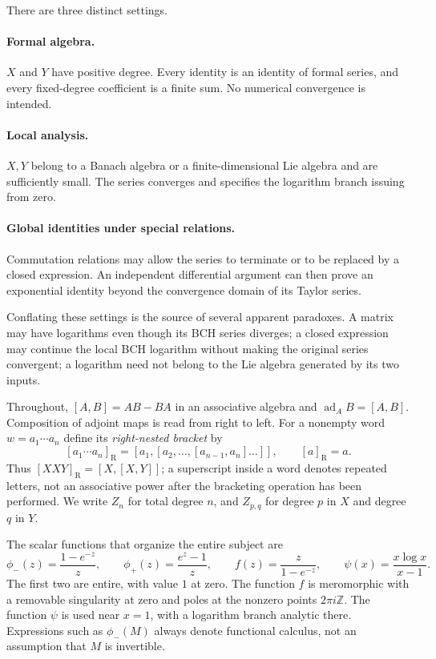 \documentclass[11pt]{article}
\numberwithin{equation}{section}
\theoremstyle{definition}
\theoremstyle{remark}
\DeclareMathOperator{\ad}{ad}
\newcommand{\Z}{\mathbb{Z}}
\newcommand{\RB}[1]{[#1]_{\mathrm R}}
\begin{document}
There are three distinct settings.

\paragraph{Formal algebra.}
$X$ and $Y$ have positive degree. Every identity is an identity of formal
series, and every fixed-degree coefficient is a finite sum. No numerical
convergence is intended.
\paragraph{Local analysis.}
$X,Y$ belong to a Banach algebra or a finite-dimensional Lie algebra and
are sufficiently small. The series converges and specifies the logarithm
branch issuing from zero.
\paragraph{Global identities under special relations.}
Commutation relations may allow the series to terminate or to be replaced
by a closed expression. An independent differential argument can then prove
an exponential identity beyond the convergence domain of its Taylor series.

Conflating these settings is the source of several apparent paradoxes.
A matrix may have logarithms even though its BCH series diverges; a closed
expression may continue the local BCH logarithm without making the original
series convergent; a logarithm need not belong to the Lie algebra generated
by its two inputs.

Throughout, $[A,B]=AB-BA$ in an associative algebra and
$\ad_A B=[A,B]$. Composition of adjoint maps is read from right to left.
For a nonempty word $w=a_1\cdots a_n$ define its \emph{right-nested bracket}
by
\begin{equation}\label{eq:rightbracket}
 \RB{a_1\cdots a_n}=[a_1,[a_2,\ldots,[a_{n-1},a_n]\ldots]],
 \qquad \RB{a}=a.
\end{equation}
Thus $\RB{XXY}=[X,[X,Y]]$; a superscript inside a word denotes repeated
letters, not an associative power after the bracketing operation has been
performed. We write $Z_n$ for total degree $n$, and $Z_{p,q}$ for degree $p$
in $X$ and degree $q$ in $Y$.

The scalar functions that organize the entire subject are
\begin{equation}\label{eq:scalarfunctions}
 \phi_-(z)=\frac{1-e^{-z}}{z},\qquad
 \phi_+(z)=\frac{e^z-1}{z},\qquad
 f(z)=\frac{z}{1-e^{-z}},\qquad
 \psi(x)=\frac{x\log x}{x-1}.
\end{equation}
The first two are entire, with value $1$ at zero. The function $f$ is
meromorphic with a removable singularity at zero and poles at the nonzero
points $2\pi i\Z$. The function $\psi$ is used near $x=1$, with a logarithm
branch analytic there. Expressions such as $\phi_-(M)$ always denote
functional calculus, not an assumption that $M$ is invertible.
\end{document}
